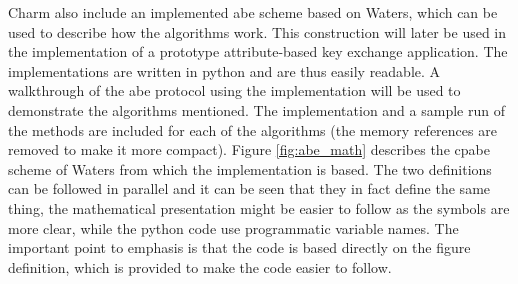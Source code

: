 Charm also include an implemented \gls{abe} scheme based on Waters\cite{abe_waters09}, which can be used to describe how the algorithms work. This construction will later be used in the implementation of a prototype attribute-based key exchange application. The implementations are written in python and are thus easily readable. A walkthrough of the \gls{abe} protocol using the implementation will be used to demonstrate the algorithms mentioned. The implementation and a sample run of the methods are included for each of the algorithms (the memory references are removed to make it more compact). Figure \ref{fig:abe_math} describes the \gls{cpabe} scheme of Waters\cite{abe_waters09} from which the implementation is based. The two definitions can be followed in parallel and it can be seen that they in fact define the same thing, the mathematical presentation might be easier to follow as the symbols are more clear, while the python code use programmatic variable names. The important point to emphasis is that the code is based directly on the figure definition, which is provided to make the code easier to follow.

